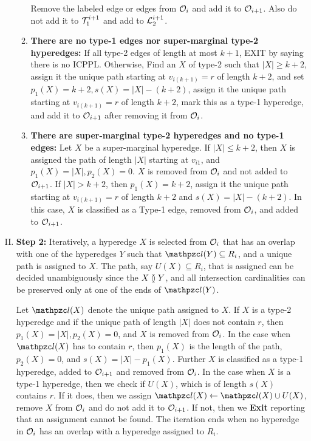 \documentclass[MS]             %
              {iitmdiss_as}    %
\begin{document}
\begin{enumerate}[I.]
\begin{enumerate}
\begin{enumerate}[{\em Case }1. ]
  \end{enumerate}
  Remove the labeled edge or edges from ${\cal O}_i$ and add it to
  ${\cal O}_{i+1}$. Also do not add it to ${\cal T}_1^{i+1}$ and add to
  ${\cal L}_2^{i+1}$.
\item {\bf {There are no type-1 edges nor} super-marginal type-2
    hyperedges:} If all type-2 edges of length at most $k+1$, EXIT by
  saying there is no ICPPL.  Otherwise, Find an $X$ of type-2 such
  that $|X| \geq k+2$, assign it the unique path starting at
  $v_{i(k+1)}=r$ of length $k+2$, and set $p_1(X)=k+2,
  s(X)=|X|-(k+2)$, assign it the unique path starting at
  $v_{i(k+1)}=r$ of length $k+2$, mark this as a type-1 hyperedge, and
  add it to ${\cal O}_{i+1}$ after removing it from ${\cal O}_i$.

\item {\bf There are super-marginal type-2 hyperedges {and no type-1
      edges:}} Let $X$ be a super-marginal hyperedge. If $|X| \leq
  k+2$, then $X$ is assigned the path of length $|X|$ starting at
  $v_{i1}$, and $p_1(X) = |X|, p_2(X)=0$. $X$ is removed from ${\cal O}_i$
  and not added to ${\cal O}_{i+1}$.  If $|X| > k+2$, then $p_1(X)=k+2$,
  assign it the unique path starting at $v_{i(k+1)}=r$ of length $k+2$
  and $s(X) = |X| - (k+2)$.  In this case, $X$ is classified as a
  Type-1 edge, removed from ${\cal O}_i$, and added to ${\cal O}_{i+1}$.
\end{enumerate}
\item {\bf Step 2:} Iteratively, a hyperedge $X$ is selected from
  ${\cal O}_i$ that has an overlap with one of the hyperedges $Y$ such that
  $\cl(Y) \subseteq R_i$, and a unique path is assigned to $X$.  The
  path, say $U(X) \subseteq R_i$, that is assigned can be decided
  unambiguously since the $X \between Y$, and all intersection
  cardinalities can be preserved only at one of the ends of $\cl(Y)$.
  
  \noindent
  Let $\cl(X)$ denote the unique path assigned to $X$.  If $X$ is a
  type-2 hyperedge and if the unique path of length $|X|$ does not
  contain $r$, then $p_1(X) = |X|, p_2(X)=0$, and $X$ is removed from
  ${\cal O}_i$.  In the case when $\cl(X)$ has to contain $r$, then
  $p_1(X)$ is the length of the path, $p_2(X)=0$, and $s(X) =
  |X|-p_1(X)$. Further $X$ is classified as a type-1 hyperedge, added
  to ${\cal O}_{i+1}$ and removed from ${\cal O}_i$.  In the case when $X$ is a
  type-1 hyperedge, then we check if $U(X)$, which is of length $s(X)$
  contains $r$. If it does, then we assign $\cl(X) \leftarrow \cl(X)
  \cup U(X)$, remove $X$ from ${\cal O}_i$ and do not add it to
  ${\cal O}_{i+1}$.  If not, then we {\bf Exit} reporting that an
  assignment cannot be found.  The iteration ends when no hyperedge in
  ${\cal O}_i$ has an overlap with a hyperedge assigned to $R_i$.
\end{enumerate}
\end{document}
